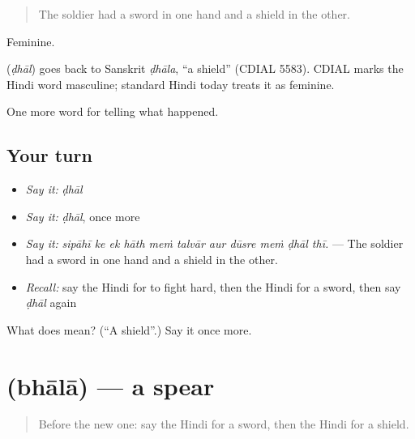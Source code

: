\begin{quote}
The soldier had a sword in one hand and a shield in the other.
\end{quote}

Feminine.

\begin{cousinweb}
\textbf{} (\emph{ḍhāl}) goes back to Sanskrit \emph{ḍhāla}, \textquotedblleft{}a shield\textquotedblright{} (CDIAL 5583). CDIAL marks the Hindi word masculine; standard Hindi today treats it as feminine.
\end{cousinweb}

\begin{grammarlens}[title={What you've built}]
One more word for telling what happened.
\end{grammarlens}

\subsection*{Your turn}
\begin{itemize}
\raggedright
  \item \emph{Say it:} \emph{ḍhāl}
  \item \emph{Say it:} \emph{ḍhāl}, once more
  \item \emph{Say it:} \emph{sipāhī ke ek hāth meṁ talvār aur dūsre meṁ ḍhāl thī.} — The soldier had a sword in one hand and a shield in the other.
  \item \emph{Recall:} say the Hindi for to fight hard, then the Hindi for a sword, then say \emph{ḍhāl} again
\end{itemize}

\begin{tcolorbox}[breakable,colback=teal!4,colframe=teal!35!black,title={Before you move on}]
What does  mean? (\textquotedblleft{}A shield\textquotedblright{}.) Say it once more.
\end{tcolorbox}
\section[\texorpdfstring{\hi{भाला} (bhālā)}{भाला (bhālā)}]{ (bhālā) — a spear}

\label{lesson:HI-C322-bhala}



\begin{quote}
Before the new one: say the Hindi for a sword, then the Hindi for a shield.
\end{quote}

